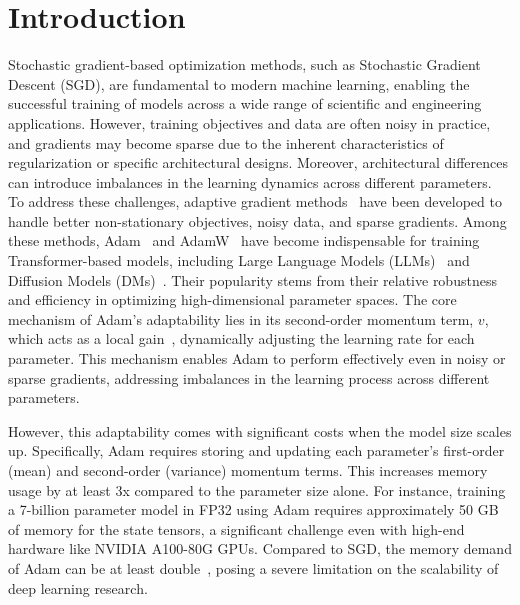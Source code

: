 \section{Introduction}
\label{sec:intro}

Stochastic gradient-based optimization methods, such as Stochastic Gradient Descent (SGD), are fundamental to modern machine learning, enabling the successful training of models across a wide range of scientific and engineering applications. However, training objectives and data are often noisy in practice, and gradients may become sparse due to the inherent characteristics of regularization or specific architectural designs. Moreover, architectural differences can introduce imbalances in the learning dynamics across different parameters. To address these challenges, adaptive gradient methods~\cite{cohen2024adaptivegradientmethodsedge} have been developed to handle better non-stationary objectives, noisy data, and sparse gradients. Among these methods, Adam~\cite{kingma2014adam} and AdamW~\cite{loshchilov2019decoupled} have become indispensable for training Transformer-based models, including Large Language Models (LLMs)~\cite{radford2019language, team2023gemini} and Diffusion Models (DMs)~\cite{ho2020denoising, rombach2022highresolutionimagesynthesislatent}. Their popularity stems from their relative robustness and efficiency in optimizing high-dimensional parameter spaces. The core mechanism of Adam's adaptability lies in its second-order momentum term, $v$,  which acts as a local gain~\cite{hinton2012neural}, dynamically adjusting the learning rate for each parameter. This mechanism enables Adam to perform effectively even in noisy or sparse gradients, addressing imbalances in the learning process across different parameters.


However, this adaptability comes with significant costs when the model size scales up. Specifically, Adam requires storing and updating each parameter's first-order (mean) and second-order (variance) momentum terms. This increases memory usage by at least 3x compared to the parameter size alone. For instance, training a 7-billion parameter model in FP32 using Adam requires approximately 50 GB of memory for the state tensors, a significant challenge even with high-end hardware like NVIDIA A100-80G GPUs. Compared to SGD, the memory demand of Adam can be at least double~\cite{zhang2024adamminiusefewerlearning}, posing a severe limitation on the scalability of deep learning research.

